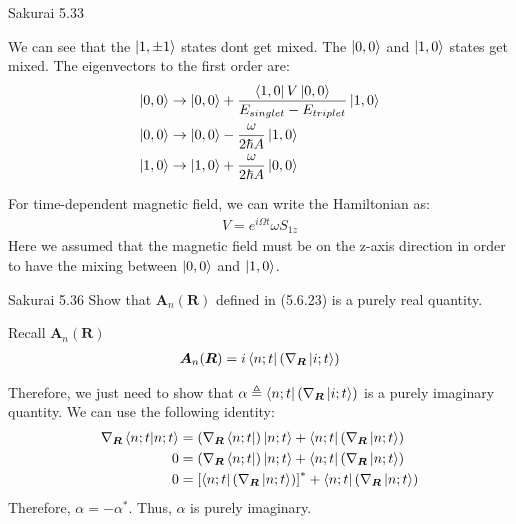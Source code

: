 \documentclass{article}
\newcommand{\bs}{\boldsymbol}
\begin{document}
\begin{section}{Sakurai 5.33}
\begin{tcolorbox}[breakable]
	We can see that the $\ket{1, \pm 1}$ states dont get mixed. The $\ket{0, 0}$ and $\ket{1, 0}$ states get mixed. The eigenvectors to the first order are:
	\begin{align*}
		\ket{0, 0} &\rightarrow \ket{0, 0} + \frac{\bra{1,0} V \ket{0,0}}{E_{singlet} - E_{triplet}} \ket{1, 0} \\
		\ket{0, 0} &\rightarrow \ket{0, 0} - \frac{\omega}{2 \hbar A} \ket{1, 0} \\
		\ket{1, 0} &\rightarrow \ket{1, 0} + \frac{\omega}{2 \hbar A} \ket{0, 0}
	\end{align*}

	For time-dependent magnetic field, we can write the Hamiltonian as:
	\begin{align*}
		V = e^{i \Omega t} \omega S_{1z}
	\end{align*}
	Here we assumed that the magnetic field must be on the z-axis direction in order to have the mixing between $\ket{0,0}$ and $\ket{1,0}$.
\end{tcolorbox}
\end{section}

\newpage
\begin{section}{Sakurai 5.36}
Show that $\bs{A}_n (\bs{R})$ defined in (5.6.23) is a purely real quantity.

\begin{tcolorbox}[breakable]
	Recall $\bs{A}_n (\bs{R})$
	\begin{align*}
		\bs{A}_n (\bs{R}) = i \bra{n;t} \left( \nabla_{\bs{R}} \ket{i;t} \right)
	\end{align*}

	Therefore, we just need to show that $ \alpha \triangleq \bra{n;t} \left( \nabla_{\bs{R}} \ket{i;t} \right)$ is a purely imaginary quantity. We can use the following identity:
	\begin{align*}
		\nabla_{\bs{R}} \bra{n;t} \ket{n;t} &= (\nabla_{\bs{R}} \bra{n;t}) \ket{n;t} + \bra{n;t} (\nabla_{\bs{R}} \ket{n;t}) \\
		0 &= (\nabla_{\bs{R}} \bra{n;t}) \ket{n;t} + \bra{n;t} (\nabla_{\bs{R}} \ket{n;t}) \\
		0 &= \left[ \bra{n;t} (\nabla_{\bs{R}} \ket{n;t}) \right]^*  + \bra{n;t} (\nabla_{\bs{R}} \ket{n;t})
	\end{align*}
	Therefore, $\alpha = -\alpha^*$. Thus, $\alpha$ is purely imaginary.
\end{tcolorbox}
\end{section}
\end{document}
